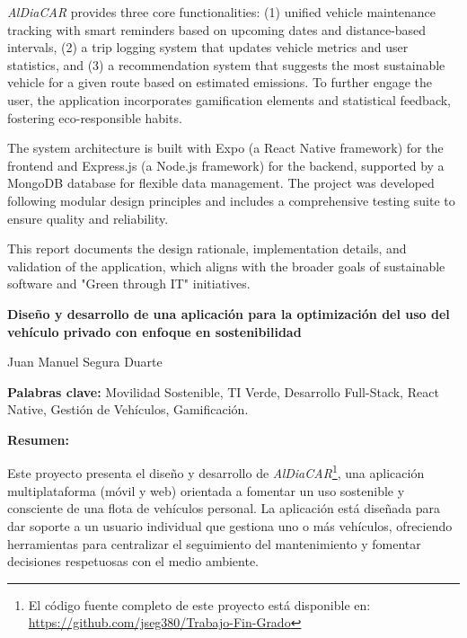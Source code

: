 \textit{AlDiaCAR} provides three core functionalities: (1) unified vehicle maintenance tracking with smart reminders based on upcoming dates and distance-based intervals, (2) a trip logging system that updates vehicle metrics and user statistics, and (3) a recommendation system that suggests the most sustainable vehicle for a given route based on estimated emissions. To further engage the user, the application incorporates gamification elements and statistical feedback, fostering eco-responsible habits.

\textgap

The system architecture is built with Expo (a React Native framework) for the frontend and Express.js (a Node.js framework) for the backend, supported by a MongoDB database for flexible data management. The project was developed following modular design principles and includes a comprehensive testing suite to ensure quality and reliability.

\textgap

This report documents the design rationale, implementation details, and validation of the application, which aligns with the broader goals of sustainable software and "Green through IT" initiatives.

\newpage


\begin{center}
    {\large\bfseries Diseño y desarrollo de una aplicación para la optimización del uso del vehículo privado con enfoque en sostenibilidad}
\end{center}
\begin{center}
    Juan Manuel Segura Duarte
\end{center}

\begin{flushleft}
    \textbf{Palabras clave:} Movilidad Sostenible, TI Verde, Desarrollo Full-Stack, React Native, Gestión de Vehículos, Gamificación.
\end{flushleft}

\begin{flushleft}
    \textbf{Resumen:}
\end{flushleft}

Este proyecto presenta el diseño y desarrollo de \textit{AlDiaCAR}\footnote{El código fuente completo de este proyecto está disponible en: \url{https://github.com/jseg380/Trabajo-Fin-Grado}}, una aplicación multiplataforma (móvil y web) orientada a fomentar un uso sostenible y consciente de una flota de vehículos personal. La aplicación está diseñada para dar soporte a un usuario individual que gestiona uno o más vehículos, ofreciendo herramientas para centralizar el seguimiento del mantenimiento y fomentar decisiones respetuosas con el medio ambiente.

